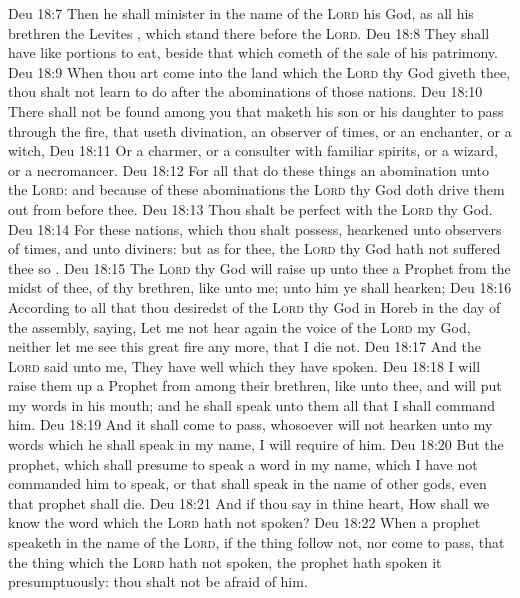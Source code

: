 \vs Deu 18:7 Then he shall minister in the name of the \textsc{Lord} his God, as all his brethren the Levites , which stand there before the \textsc{Lord}.
\vs Deu 18:8 They shall have like portions to eat, beside that which cometh of the sale of his patrimony.
\vs Deu 18:9 When thou art come into the land which the \textsc{Lord} thy God giveth thee, thou shalt not learn to do after the abominations of those nations.
\vs Deu 18:10 There shall not be found among you  that maketh his son or his daughter to pass through the fire,  that useth divination,  an observer of times, or an enchanter, or a witch,
\vs Deu 18:11 Or a charmer, or a consulter with familiar spirits, or a wizard, or a necromancer.
\vs Deu 18:12 For all that do these things  an abomination unto the \textsc{Lord}: and because of these abominations the \textsc{Lord} thy God doth drive them out from before thee.
\vs Deu 18:13 Thou shalt be perfect with the \textsc{Lord} thy God.
\vs Deu 18:14 For these nations, which thou shalt possess, hearkened unto observers of times, and unto diviners: but as for thee, the \textsc{Lord} thy God hath not suffered thee so .
\vs Deu 18:15 The \textsc{Lord} thy God will raise up unto thee a Prophet from the midst of thee, of thy brethren, like unto me; unto him ye shall hearken;
\vs Deu 18:16 According to all that thou desiredst of the \textsc{Lord} thy God in Horeb in the day of the assembly, saying, Let me not hear again the voice of the \textsc{Lord} my God, neither let me see this great fire any more, that I die not.
\vs Deu 18:17 And the \textsc{Lord} said unto me, They have well  which they have spoken.
\vs Deu 18:18 I will raise them up a Prophet from among their brethren, like unto thee, and will put my words in his mouth; and he shall speak unto them all that I shall command him.
\vs Deu 18:19 And it shall come to pass,  whosoever will not hearken unto my words which he shall speak in my name, I will require  of him.
\vs Deu 18:20 But the prophet, which shall presume to speak a word in my name, which I have not commanded him to speak, or that shall speak in the name of other gods, even that prophet shall die.
\vs Deu 18:21 And if thou say in thine heart, How shall we know the word which the \textsc{Lord} hath not spoken?
\vs Deu 18:22 When a prophet speaketh in the name of the \textsc{Lord}, if the thing follow not, nor come to pass, that  the thing which the \textsc{Lord} hath not spoken,  the prophet hath spoken it presumptuously: thou shalt not be afraid of him.
